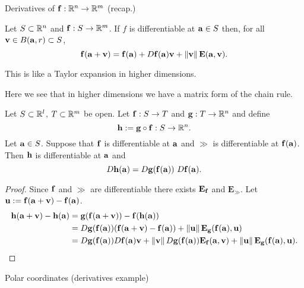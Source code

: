 {Derivatives of \(\ff : \bR^n \to \bR^m\) (recap.)}


Let \(S\subset \bR^n\) and \(\ff : S \to \bR^m\).
If \(f\) is differentiable at \(\aa \in S\) then, for all  \(\vv\in B(\aa,r) \subset S\),
\[
    \ff(\aa+\vv) = \ff(\aa) +  D\ff(\aa) \vv + \norm{\vv}\mathbf{E}(\aa,\vv).
\]


This is like a Taylor expansion in higher dimensions.


Here we see that in higher dimensions we have a matrix form of the chain rule.

\begin{theorem}
    Let \(S\subset \bR^l\), \(T\subset \bR^m\) be open.
    Let \(\ff: S \to T\) and \(\gg:T \to \bR^n\) and define
    \[
        \hh := \gg \circ \ff : S \to \bR^n.
    \]
    Let  \(\aa\in S\). Suppose that \(\ff\) is differentiable at \(\aa\) and \(\gg\) is differentiable at \(\ff(\aa)\).
    Then \(\hh\) is differentiable at \(\aa\) and
    \[
        D\hh(\aa) = D\gg(\ff(\aa)) \ D\ff(\aa).
    \]
\end{theorem}

\vspace{-1em}

\begin{proof}
    Since \(\ff\) and \(\gg\) are differentiable there exists \(\mathbf{E}_{\ff}\) and \(\mathbf{E}_{\gg}\).
    Let \(\uu := \ff(\aa+\vv) - \ff(\aa) \).
    \[
        \begin{aligned}
            \hh(\aa+\vv) - \hh(\aa)
             & = \gg(\ff(\aa+\vv)) - \ff(\hh(\aa))                                                                                               \\
             & = D\gg(\ff(\aa))(\ff(\aa+\vv) - \ff(\aa) ) + \norm{\uu}\mathbf{E}_{\gg}(\ff(\aa),\uu)                                             \\
             & = D\gg(\ff(\aa))   D\ff(\aa) \vv + \norm{\vv}D\gg(\ff(\aa))\mathbf{E}_{\ff}(\aa, \vv) + \norm{\uu}\mathbf{E}_{\gg}(\ff(\aa),\uu).
        \end{aligned} \qedhere
    \]
\end{proof}




{Polar coordinates (derivatives example)}


